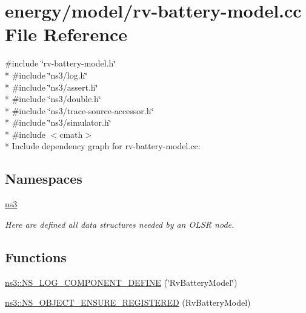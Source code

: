 \hypertarget{rv-battery-model_8cc}{}\section{energy/model/rv-\/battery-\/model.cc File Reference}
\label{rv-battery-model_8cc}
{\ttfamily \#include \char`\"{}rv-\/battery-\/model.\+h\char`\"{}}\\*
{\ttfamily \#include \char`\"{}ns3/log.\+h\char`\"{}}\\*
{\ttfamily \#include \char`\"{}ns3/assert.\+h\char`\"{}}\\*
{\ttfamily \#include \char`\"{}ns3/double.\+h\char`\"{}}\\*
{\ttfamily \#include \char`\"{}ns3/trace-\/source-\/accessor.\+h\char`\"{}}\\*
{\ttfamily \#include \char`\"{}ns3/simulator.\+h\char`\"{}}\\*
{\ttfamily \#include $<$cmath$>$}\\*
Include dependency graph for rv-\/battery-\/model.cc\+:
\subsection*{Namespaces}
\begin{DoxyCompactItemize}
\item 
 \hyperlink{namespacens3}{ns3}
\begin{DoxyCompactList}\small\item\em Here are defined all data structures needed by an O\+L\+SR node. \end{DoxyCompactList}\end{DoxyCompactItemize}
\subsection*{Functions}
\begin{DoxyCompactItemize}
\item 
\hyperlink{namespacens3_a440b0d0b693143065a3c3269468cc13d}{ns3\+::\+N\+S\+\_\+\+L\+O\+G\+\_\+\+C\+O\+M\+P\+O\+N\+E\+N\+T\+\_\+\+D\+E\+F\+I\+NE} (\char`\"{}Rv\+Battery\+Model\char`\"{})
\item 
\hyperlink{namespacens3_ac193ef3e7da18283d9e45fce2e4a061b}{ns3\+::\+N\+S\+\_\+\+O\+B\+J\+E\+C\+T\+\_\+\+E\+N\+S\+U\+R\+E\+\_\+\+R\+E\+G\+I\+S\+T\+E\+R\+ED} (Rv\+Battery\+Model)
\end{DoxyCompactItemize}
